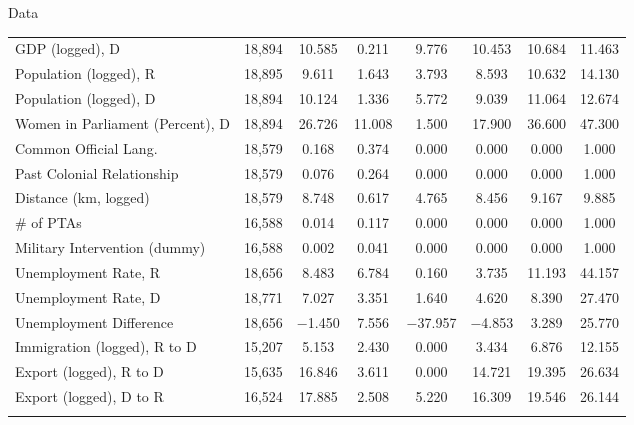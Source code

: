 \documentclass[ignorenonframetext,]{beamer}
\begin{document}
\begin{frame}{Data}
\begin{table}[!htbp]
\begin{tabular}{@{\extracolsep{5pt}}lccccccc}
GDP (logged), D & 18,894 & 10.585 & 0.211 & 9.776 & 10.453 & 10.684 & 11.463 \\ 
Population (logged), R & 18,895 & 9.611 & 1.643 & 3.793 & 8.593 & 10.632 & 14.130 \\ 
Population (logged), D & 18,894 & 10.124 & 1.336 & 5.772 & 9.039 & 11.064 & 12.674 \\ 
Women in Parliament (Percent), D & 18,894 & 26.726 & 11.008 & 1.500 & 17.900 & 36.600 & 47.300 \\ 
Common Official Lang. & 18,579 & 0.168 & 0.374 & 0.000 & 0.000 & 0.000 & 1.000 \\ 
Past Colonial Relationship & 18,579 & 0.076 & 0.264 & 0.000 & 0.000 & 0.000 & 1.000 \\ 
Distance (km, logged) & 18,579 & 8.748 & 0.617 & 4.765 & 8.456 & 9.167 & 9.885 \\ 
# of PTAs & 16,588 & 0.014 & 0.117 & 0.000 & 0.000 & 0.000 & 1.000 \\ 
Military Intervention (dummy) & 16,588 & 0.002 & 0.041 & 0.000 & 0.000 & 0.000 & 1.000 \\ 
Unemployment Rate, R & 18,656 & 8.483 & 6.784 & 0.160 & 3.735 & 11.193 & 44.157 \\ 
Unemployment Rate, D & 18,771 & 7.027 & 3.351 & 1.640 & 4.620 & 8.390 & 27.470 \\ 
Unemployment Difference & 18,656 & $-$1.450 & 7.556 & $-$37.957 & $-$4.853 & 3.289 & 25.770 \\ 
Immigration (logged), R to D & 15,207 & 5.153 & 2.430 & 0.000 & 3.434 & 6.876 & 12.155 \\ 
Export (logged), R to D & 15,635 & 16.846 & 3.611 & 0.000 & 14.721 & 19.395 & 26.634 \\ 
Export (logged), D to R & 16,524 & 17.885 & 2.508 & 5.220 & 16.309 & 19.546 & 26.144 \\ 
\hline \\[-1.8ex] 
\end{tabular} 
\end{table}

\end{frame}
\end{document}
